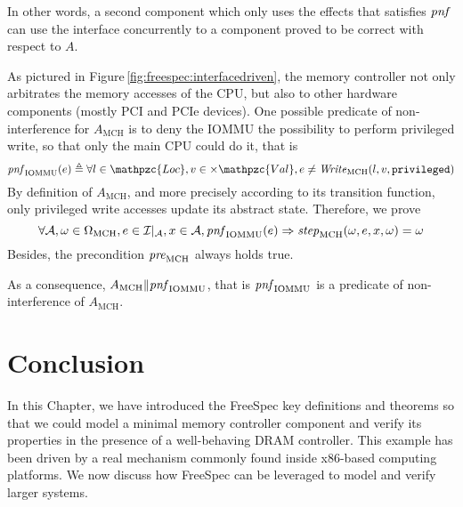 In other words, a second component which only uses the effects that satisfies
$\mathit{pnf}$ can use the interface concurrently to a component proved to be
correct with respect to \( A \).

\begin{example}
  As pictured in Figure\,\ref{fig:freespec:interfacedriven}, the memory
  controller not only arbitrates the memory accesses of the CPU, but also to
  other hardware components (mostly PCI and PCIe devices).
  One possible predicate of non-interference for $A_{\mathrm{MCH}}$ is to deny
  the IOMMU the possibility to perform privileged write, so that only the main
  CPU could do it, that is
  \[
    \func{pnf}_{\mathrm{IOMMU}}(e) \triangleq \forall l \in \mathpzc{Loc}, v \in
    \times \mathpzc{Val}, e \neq \func{Write}_{\mathrm{MCH}}(l, v,
    \texttt{privileged})
  \]
  By definition of \( A_{\mathrm{MCH}} \), and more precisely according to its
  transition function, only privileged write accesses update its abstract state.
  Therefore, we prove
  \[
    \forall \mathcal{A}, \omega \in \Omega_{\mathrm{MCH}}, e \in
    \mathcal{I}|_{\mathrm{\mathcal{A}}}, x \in \mathcal{A},
    \mathit{pnf}_{\mathrm{IOMMU}}(e) \Rightarrow
    \mathit{step}_{\mathrm{MCH}}(\omega, e, x, \omega) = \omega
  \]
  Besides, the precondition \( \mathit{pre}_{\mathrm{MCH}} \) always holds true.

  As a consequence, \( A_{\mathrm{MCH}} \| \mathit{pnf}_{\mathrm{IOMMU}} \), that
  is \( \mathit{pnf}_{\mathrm{IOMMU}} \) is a predicate of non-interference of \(
  A_{\mathrm{MCH}} \). 
\end{example}

\section{Conclusion}
\label{sec:freespec:scale}

In this Chapter, we have introduced the FreeSpec key definitions and theorems
so that we could model a minimal memory controller component and verify its
properties in the presence of a well-behaving DRAM controller.
%
This example has been driven by a real mechanism commonly found inside x86-based
computing platforms.
%
We now discuss how FreeSpec can be leveraged to model and verify larger systems. 

